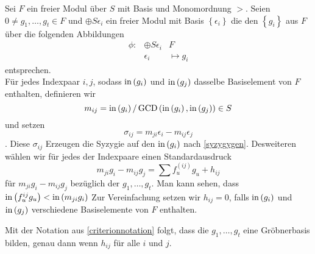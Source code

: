 \documentclass{article}
\begin{document}
\begin{nota}
	Sei
	\( F \)
	ein freier Modul \"uber
	\(S\)
	mit Basis und Monomordnung
	\( > \).
	Seien
	\( 0 \neq g_{1},\dots,g_{t} \in F\)
	und
	\( \oplus S \epsilon_{i} \)
	ein freier Modul mit Basis
	\( \left\{ \epsilon_{i} \right\} \)
	die den
	\( \left\{ g_{i} \right\}\)
	aus
	\( F \)
	\"uber die folgenden Abbildungen
	\begin{align*}
	\phi:& \oplus S \epsilon_{i} & F \\
	& \epsilon_{i} & \mapsto g_{i} 
	\end{align*}
	entsprechen. \\
	F\"ur jedes Indexpaar
	\( i, j \),
	sodass
	\( \operatorname{in} \left( g_{i} \right) \)
	und
	\( \operatorname{in} \left( g_{j} \right) \)
	dasselbe Basiselement von
	\( F \)
	enthalten,
	definieren wir
	\[
	m_{ij} 
	= \operatorname{in} \left( g_{i} \right) 
	/ \operatorname{GCD} \left( \operatorname{in}\left( g_{i} \right), 
	\operatorname{in} \left( g_{j} \right) \right) \in S
	\]
	und setzen
	\[
	\sigma_{ij} 
	= m_{ji} \epsilon_{i} 
	- m_{ij} \epsilon_{j}
	\].
	Diese
	\( \sigma_{ij} \)
	Erzeugen die Syzygie auf den
	\( \operatorname{in} \left( g_{i} \right) \)
	nach \ref{syzygygen}.
		Desweiteren w\"ahlen wir f\"ur jedes der Indexpaare einen Standardausdruck
	\[ 
	m_{ji} g_{i} -m_{ij} g_{j} = \sum f_{u}^{\left( ij \right) } g_{u} + h_{ij}
	\]
	f\"ur
	\(  m_{ji} g_{i} -m_{ij} g_{j} \)
	bez\"uglich der
	\( g_{1},\dots , g_{t} \).
	Man kann sehen,
	dass
	\( \operatorname{in} \left( f_{u}^{ij} g_{u} \right) < \operatorname{in} \left( m_{ji}g_{i} \right) \)
	Zur Vereinfachung setzen wir
	\( h_{ij} = 0 \),
	falls
	\( \operatorname{in}\left( g_{i} \right) \)
	und
	\( \operatorname{in}\left( g_{j} \right) \)
	verschiedene Basiselemente von
	\( F \)
	enthalten.
\end{nota}
\begin{thm}
	Mit der Notation aus \ref{criterionnotation} folgt,
	dass die 
	\( g_{1},\dots,g_{t} \)
	eine Gr\"obnerbasis bilden,
	genau dann wenn 
	\( h_{ij} \)
	f\"ur alle 
	\( i \)
	und 
	\( j\).
\end{thm}
\end{document}
